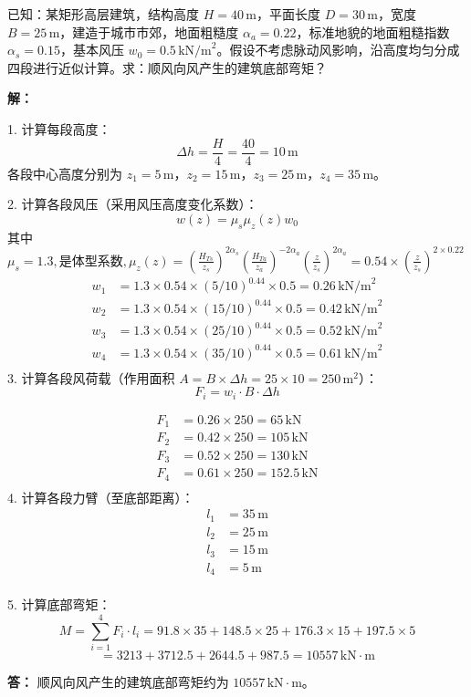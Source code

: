 \documentclass[12pt, a4paper, oneside, UTF8]{ctexbook}
\begin{document}
\begin{example}
    已知：某矩形高层建筑，结构高度 $H=40\,\mathrm{m}$，平面长度 $D=30\,\mathrm{m}$，宽度 $B=25\,\mathrm{m}$，建造于城市市郊，地面粗糙度 $\alpha_a=0.22$，标准地貌的地面粗糙指数 $\alpha_s=0.15$，基本风压 $w_0=0.5\,\mathrm{kN/m}^2$。假设不考虑脉动风影响，沿高度均匀分成四段进行近似计算。求：顺风向风产生的建筑底部弯矩？

    \textbf{解：}

    1. 计算每段高度：
    \[
    \Delta h = \frac{H}{4} = \frac{40}{4} = 10\,\mathrm{m}
    \]
    各段中心高度分别为 $z_1=5\,\mathrm{m}$，$z_2=15\,\mathrm{m}$，$z_3=25\,\mathrm{m}$，$z_4=35\,\mathrm{m}$。

    2. 计算各段风压（采用风压高度变化系数）：
    \[
    w(z) = \mu_s \mu_z(z) w_0
    \]
    其中 $\mu_s = 1.3 ,\text{是体型系数},\mu_z(z)=\left( \frac{H_{Ts}}{z_s} \right)^{2\alpha_s} \left( \frac{H_{Ta}}{z_a} \right)^{-2\alpha_a} \left( \frac{z}{z_s} \right)^{2\alpha_a} = 0.54 \times (\frac{z}{z_s})^{2 \times 0.22}$
    \begin{align*}
    w_1 &= 1.3 \times 0.54 \times (5/10)^{0.44} \times 0.5 = 0.26\,\mathrm{kN/m}^2 \\
    w_2 &= 1.3 \times 0.54 \times (15/10)^{0.44} \times 0.5 = 0.42\,\mathrm{kN/m}^2 \\
    w_3 &= 1.3 \times 0.54 \times (25/10)^{0.44} \times 0.5 = 0.52\,\mathrm{kN/m}^2 \\
    w_4 &= 1.3 \times 0.54 \times (35/10)^{0.44} \times 0.5 = 0.61\,\mathrm{kN/m}^2 \\
    \end{align*}
    3. 计算各段风荷载（作用面积 $A = B \times \Delta h = 25 \times 10 = 250\,\mathrm{m}^2$）：
    \[
    F_i = w_i \cdot B \cdot \Delta h
    \]

    \begin{align*}
    F_1 &= 0.26 \times 250 = 65\,\mathrm{kN} \\
    F_2 &= 0.42 \times 250 = 105\,\mathrm{kN} \\
    F_3 &= 0.52 \times 250 = 130\,\mathrm{kN} \\
    F_4 &= 0.61 \times 250 = 152.5\,\mathrm{kN} \\
    \end{align*}
    4. 计算各段力臂（至底部距离）：
    \begin{align*}
    l_1 &= 35\,\mathrm{m} \\
    l_2 &= 25\,\mathrm{m} \\
    l_3 &= 15\,\mathrm{m} \\
    l_4 &= 5\,\mathrm{m} \\
    \end{align*}

    5. 计算底部弯矩：
    \[
    M = \sum_{i=1}^{4} F_i \cdot l_i = 91.8 \times 35 + 148.5 \times 25 + 176.3 \times 15 + 197.5 \times 5
    \]
    \[
    = 3213 + 3712.5 + 2644.5 + 987.5 = 10557\,\mathrm{kN \cdot m}
    \]

    \textbf{答：} 顺风向风产生的建筑底部弯矩约为 $10557\,\mathrm{kN \cdot m}$。

\end{example}
\end{document}
